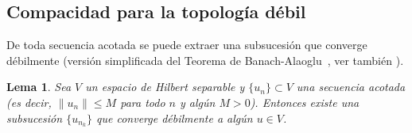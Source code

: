 \documentclass[12pt]{book}
\newtheorem{lemma}{Lema}
\theoremstyle{definition}
\theoremstyle{plain}
\theoremstyle{remark}
\begin{document}


\subsection{Compacidad para la topología débil}

De toda secuencia acotada se puede extraer una subsucesión que converge débilmente (versi\'on simplificada del Teorema de Banach-Alaoglu~\cite{brezis2011}, ver tambi\'en \cite{allaire2007}).

\begin{lemma}
    Sea \(V\) un espacio de Hilbert separable y \(\{u_n\} \subset V\) una secuencia acotada (es decir, \(\|u_n\| \leq M\) para todo \(n\) y algún \(M > 0\)). Entonces existe una subsucesión \(\{u_{n_k}\}\) que converge débilmente a algún \(u \in V\).
\end{lemma}
\end{document}
